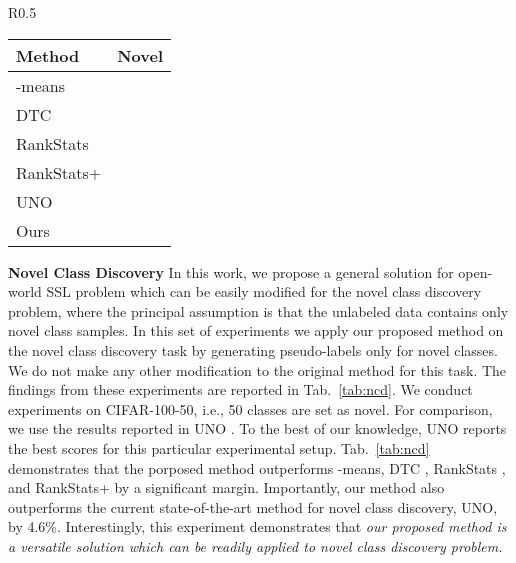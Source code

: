 \documentclass[runningheads]{eccv2022submission}
\begin{document}
  


\begin{wraptable}{R}{0.5\textwidth}
\vspace{-8mm}
\caption{Performance on novel class discovery task on \textbf{CIFAR-100} dataset with 50\% classes as seen and 50\% classes as novel.}
\vspace{-6mm}
\begin{center}
\small
\begin{tabular}{lc}
\hline

\textbf{Method}  & \textbf{Novel}\\

\hline
-means & \\
DTC\cite{han2019learning} & \\
RankStats\cite{Han2020Automatically} & \\
RankStats+\cite{Han2020Automatically} & \\
UNO\cite{fini2021unified} & \\
Ours & {\cellcolor{yellow!15}}\\\hline 

\end{tabular}
\end{center}
\label{tab:ncd}
\vspace{-8mm}
\end{wraptable}


\vspace{2mm}
\noindent \textbf{Novel Class Discovery}
In this work, we propose a general solution for open-world SSL problem which can be easily modified for the novel class discovery problem, where the principal assumption is that the unlabeled data contains only novel class samples. In this set of experiments we apply our proposed method on the novel class discovery task by generating pseudo-labels only for novel classes. We do not make any other modification to the original method for this task. The findings from these experiments are reported in Tab.~\ref{tab:ncd}. We conduct experiments on CIFAR-100-50, i.e., 50 classes are set as novel. For comparison, we use the results reported in UNO \cite{fini2021unified}. To the best of our knowledge, UNO reports the best scores for this particular experimental setup. Tab.~\ref{tab:ncd} demonstrates that the porposed method outperforms -means, DTC \cite{han2019learning}, RankStats \cite{Han2020Automatically}, and RankStats+ by a significant margin. Importantly, our method also outperforms the current state-of-the-art method for novel class discovery, UNO, by 4.6\%. Interestingly, this experiment demonstrates that \emph{our proposed method is a versatile solution which can be readily applied to novel class discovery problem.}
\end{document}
